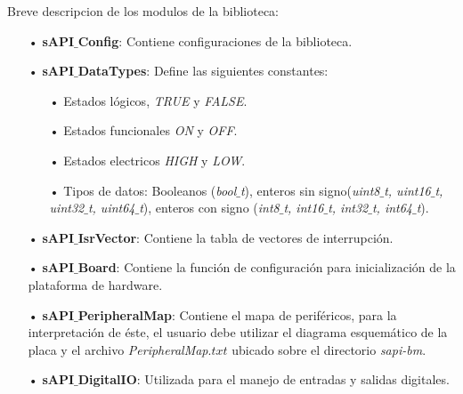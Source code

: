 \documentclass[12pt,letterpaper]{article}
\begin{document}
Breve descripcion de los modulos de la biblioteca:
\begin{enumerate}
\item[•]\textbf{sAPI$\_$Config}: Contiene configuraciones de la biblioteca.
\item[•]\textbf{sAPI$\_$DataTypes}: Define las siguientes constantes:
\begin{enumerate}
\item[•]Estados lógicos, \textit{TRUE} y \textit{FALSE}.
\item[•]Estados funcionales \textit{ON} y \textit{OFF}.
\item[•]Estados electricos \textit{HIGH} y \textit{LOW}.
\item[•]Tipos de datos: Booleanos (\textit{bool$\_$t}), enteros sin signo(\textit{uint8$\_$t, uint16$\_$t, uint32$\_$t, uint64$\_$t}), enteros con signo (\textit{int8$\_$t, int16$\_$t, int32$\_$t, int64$\_$t}).
\end{enumerate}
\item[•]\textbf{sAPI$\_$IsrVector}: Contiene la tabla de vectores de interrupción.
\item[•]\textbf{sAPI$\_$Board}: Contiene la función de configuración para inicialización de la plataforma de hardware.
\item[•]\textbf{sAPI$\_$PeripheralMap}: Contiene el mapa de periféricos, para la interpretación de éste, el usuario debe utilizar el diagrama esquemático de la placa y el archivo \textit{PeripheralMap$.txt$} ubicado sobre el directorio \textit{sapi-bm}.
\item[•]\textbf{sAPI$\_$DigitalIO}: Utilizada para el manejo de entradas y salidas digitales.
\end{enumerate}
\end{document}
